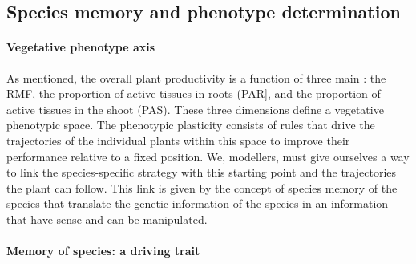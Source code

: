 
\subsection{Species memory and phenotype determination}\label{subsection:memory}


\paragraph{Vegetative phenotype axis}

As mentioned, the overall plant productivity is a function of three main : the RMF, the proportion of active tissues in roots (PAR], and the proportion of active tissues in the shoot (PAS). These three dimensions define a vegetative phenotypic space. The phenotypic plasticity consists of rules that drive the trajectories of the individual plants within this space to improve their performance relative to a fixed position. We, modellers, must give ourselves a way to link the species-specific strategy with this starting point and the trajectories the plant can follow. This link is given by the concept of species memory of the species that translate the genetic information of the species in an information that have sense and can be manipulated.


\paragraph{Memory of species: a driving trait}

